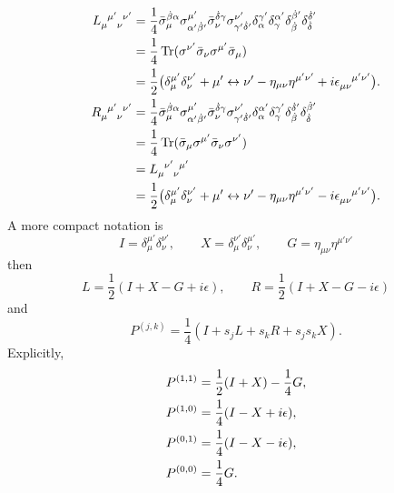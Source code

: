 \begin{align}
    \tensor{L}{_\mu^{\mu'}_\nu^{\nu'}} & = \frac{1}{4} \bar\sigma_\mu^{\dot\beta \alpha} \sigma^{\mu'}_{\alpha' \dot\beta'} \bar\sigma_\nu^{\dot\delta \gamma} \sigma^{\nu'}_{\gamma' \dot\delta'} \delta_\alpha^{\gamma'} \delta_\gamma^{\alpha'} \delta_{\dot\beta}^{\dot\beta'} \delta_{\dot\delta}^{\dot\delta'} \notag \\
    & = \frac{1}{4} \Tr(\sigma^{\nu'} \bar\sigma_\nu \sigma^{\mu'} \bar\sigma_\mu) \notag \\
    & = \frac{1}{2} \bigl(\delta_\mu^{\mu'} \delta_\nu^{\nu'} + \mu' \leftrightarrow \nu' - \eta_{\mu \nu} \eta^{\mu' \nu'} + i \tensor{\epsilon}{_{\mu \nu}^{\mu' \nu'}} \bigr). \\
    \tensor{R}{_\mu^{\mu'}_\nu^{\nu'}} & = \frac{1}{4} \bar\sigma_\mu^{\dot\beta \alpha} \sigma^{\mu'}_{\alpha' \dot\beta'} \bar\sigma_\nu^{\dot\delta \gamma} \sigma^{\nu'}_{\gamma' \dot\delta'} \delta_\alpha^{\alpha'} \delta_\gamma^{\gamma'} \delta_{\dot\beta}^{\dot\delta'} \delta_{\dot\delta}^{\dot\beta'} \notag \\
    & = \frac{1}{4} \Tr(\bar\sigma_\mu \sigma^{\mu'} \bar\sigma_\nu \sigma^{\nu'}) \notag \\
    & = \tensor{L}{_\mu^{\nu'}_\nu^{\mu'}} \notag \\
    & = \frac{1}{2} \bigl(\delta_\mu^{\mu'} \delta_\nu^{\nu'} + \mu' \leftrightarrow \nu' - \eta_{\mu \nu} \eta^{\mu' \nu'} - i \tensor{\epsilon}{_{\mu \nu}^{\mu' \nu'}} \bigr).
\end{align}
A more compact notation is
\begin{equation}
    I = \delta_\mu^{\mu'} \delta_\nu^{\nu'}, \qquad X = \delta_\mu^{\nu'} \delta_\nu^{\mu'}, \qquad G = \eta_{\mu \nu} \eta^{\mu' \nu'}
\end{equation}
then
\begin{equation}
    L = \frac{1}{2} (I + X - G + i \epsilon), \qquad R = \frac{1}{2} (I + X - G - i \epsilon)
\end{equation}
and
\begin{equation}
    P^{(j, k)} = \frac{1}{4} (I + s_j L + s_k R + s_j s_k X).
\end{equation}
Explicitly,
\begin{align}
    P^{(1, 1)} & = \frac{1}{2} (I + X) - \frac{1}{4} G, \notag \\
    P^{(1, 0)} & = \frac{1}{4} (I - X + i \epsilon), \notag \\
    P^{(0, 1)} & = \frac{1}{4} (I - X - i \epsilon), \notag \\
    P^{(0, 0)} & = \frac{1}{4} G.
\end{align}
